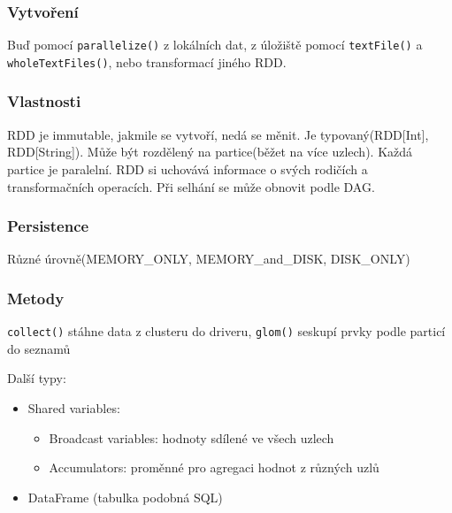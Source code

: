 \subsubsection{Vytvoření}
Buď pomocí \texttt{parallelize()} z lokálních dat, z úložiště pomocí \texttt{textFile()} a \texttt{wholeTextFiles()}, nebo transformací jiného RDD. 

\subsubsection{Vlastnosti}
 RDD je immutable, jakmile se vytvoří, nedá se měnit. Je typovaný(RDD[Int], RDD[String]). Může být rozdělený na partice(běžet na více uzlech). Každá partice je paralelní. RDD si uchovává informace o
 svých rodičích a transformačních operacích. Při selhání se může obnovit podle DAG.

\subsubsection{Persistence}
Různé úrovně(MEMORY\_ONLY, MEMORY\_and\_DISK, DISK\_ONLY)

\subsubsection{Metody}
\texttt{collect()} stáhne data z clusteru do driveru, \texttt{glom()} seskupí prvky podle particí do seznamů

Další typy:
\begin{itemize}
    \item Shared variables:
    \begin{itemize}
        \item Broadcast variables: hodnoty sdílené ve všech uzlech
        \item Accumulators: proměnné pro agregaci hodnot z různých uzlů
    \end{itemize}
    \item DataFrame (tabulka podobná SQL)
\end{itemize}

